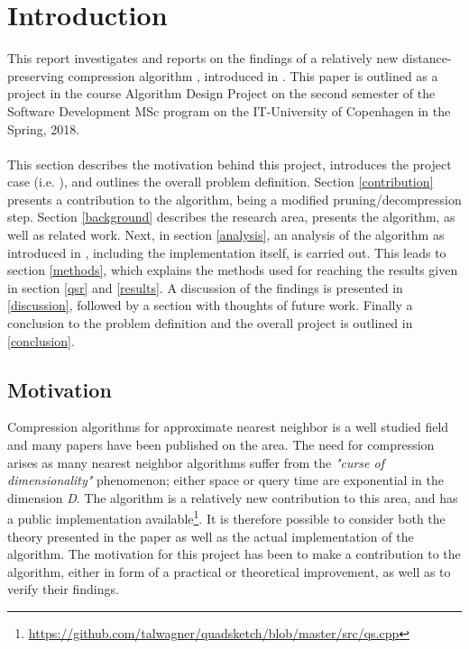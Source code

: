 \section{Introduction}
\label{introduction}
This report investigates and reports on the findings of a relatively new distance-preserving compression algorithm \qs{}, introduced in \cite{wagner17}. This paper is outlined as a project in the course Algorithm Design Project on the second semester of the Software Development MSc program on the IT-University of Copenhagen in the Spring, 2018.
\\
\\
This section describes the motivation behind this project, introduces the project case (i.e. \qs{}), and outlines the overall problem definition. Section \ref{contribution} presents a contribution to the algorithm, being a modified pruning/decompression step. Section \ref{background} describes the research area, presents the \qs{} algorithm, as well as related work. Next, in section \ref{analysis}, an analysis of the algorithm as introduced in \cite{wagner17}, including the \qs{} implementation itself, is carried out. This leads to section \ref{methods}, which explains the methods used for reaching the results given in section \ref{qsr} and \ref{results}. A discussion of the findings is presented in \ref{discussion}, followed by a section with thoughts of future work. Finally a conclusion to the problem definition and the overall project is outlined in \ref{conclusion}.

\subsection{Motivation} %
Compression algorithms for approximate nearest neighbor is a well studied field and many papers have been published on the area. The need for compression arises as many nearest neighbor algorithms suffer from the \textit{"curse of dimensionality"} phenomenon; either space or query time are exponential in the dimension \textit{D}\cite{ilya15}. The \qs{} algorithm is a relatively new contribution to this area, and has a public implementation available\footnote{\url{https://github.com/talwagner/quadsketch/blob/master/src/qs.cpp}}. It is therefore possible to consider both the theory presented in the paper as well as the actual implementation of the algorithm. The motivation for this project has been to make a contribution to the algorithm, either in form of a practical or theoretical improvement, as well as to verify their findings.

